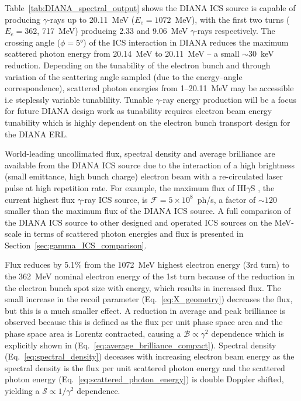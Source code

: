 \documentclass[../main.tex]{subfiles}
\begin{document}
Table~\ref{tab:DIANA_spectral_output} shows the DIANA ICS source is capable of producing $\gamma$-rays up to 20.11~\si{\mega\electronvolt} ($E_{e}=1072$~\si{\mega\electronvolt}), with the first two turns ($E_{e} = $362, 717~\si{\mega\electronvolt}) producing 2.33 and 9.06~\si{\mega\electronvolt} $\gamma$-rays respectively. The crossing angle ($\phi=5\si{\degree}$) of the ICS interaction in DIANA reduces the maximum scattered photon energy from 20.14~\si{\mega\electronvolt} to 20.11~\si{\mega\electronvolt} -- a small $\sim 30$~\si{\kilo\electronvolt} reduction. Depending on the tunability of the electron bunch and through variation of the scattering angle sampled (due to the energy--angle correspondence), scattered photon energies from 1--20.11~\si{\mega\electronvolt} may be accessible i.e  steplessly variable tunablility. Tunable $\gamma$-ray energy production will be a focus for future DIANA design work as tunability requires electron beam energy tunability which is highly dependent on the electron bunch transport design for the DIANA ERL. 

World-leading uncollimated flux, spectral density and average brilliance are available from the DIANA ICS source due to the interaction of a high brightness (small emittance, high bunch charge) electron beam with a re-circulated laser pulse at high repetition rate. For example, the maximum flux of HI$\gamma$S \cite{weller2009research}, the current highest flux $\gamma$-ray ICS source, is $\mathcal{F} =5\times 10^{8}$~ph/\si{\second}, a factor of $\sim 120$ smaller than the maximum flux of the DIANA ICS source. A full comparison of the DIANA ICS source to other designed and operated ICS sources on the \si{\mega\electronvolt}-scale in terms of scattered photon energies and flux is presented in Section~\ref{sec:gamma_ICS_comparison}. 

Flux reduces by 5.1\% from the 1072~\si{\mega\electronvolt} highest electron energy (3rd turn) to the 362~\si{\mega\electronvolt} nominal electron energy of the 1st turn because of the reduction in the electron bunch spot size with energy, which results in increased flux. The small increase in the recoil parameter (Eq.~\ref{eq:X_geometry}) decreases the flux, but this is a much smaller effect. A reduction in average and peak brilliance is observed because this is defined as the flux per unit phase space area and the phase space area is Lorentz contracted, causing a $\mathcal{B}\propto \gamma^{2}$ dependence which is explicitly shown in (Eq.~\ref{eq:average_brilliance_compact}). Spectral density (Eq.~\ref{eq:spectral_density}) deceases with increasing electron beam energy as the spectral density is the flux per unit scattered photon energy and the scattered photon energy (Eq.~\ref{eq:scattered_photon_energy}) is double Doppler shifted, yielding a $\mathcal{S}\propto 1/\gamma^{2}$ dependence.  
\end{document}
